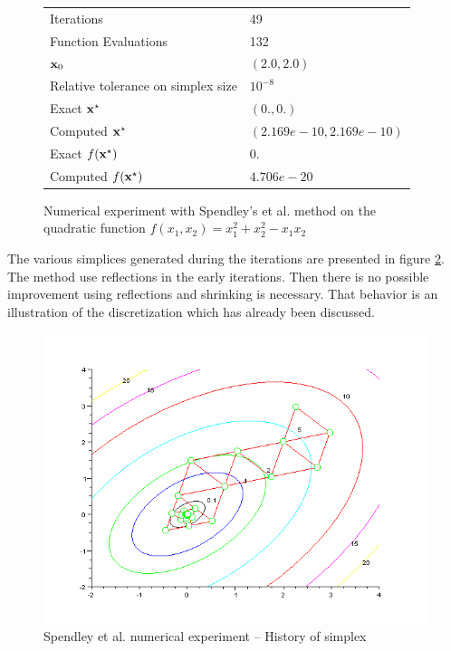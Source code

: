 \begin{figure}[htbp]
\begin{center}
\begin{tabular}{|l|l|}
\hline
Iterations & 49 \\
Function Evaluations & 132 \\
$\mathbf{x}_0$ & $(2.0,2.0)$ \\
Relative tolerance on simplex size & $10^{-8}$ \\
Exact $\mathbf{x}^\star$ & $(0.,0.)$\\
Computed $\mathbf{x}^\star$ & $(2.169e-10, 2.169e-10)$\\
Exact $f(\mathbf{x}^\star)$ & $0.$\\
Computed $f(\mathbf{x}^\star)$ & $4.706e-20$\\
\hline
\end{tabular}
\end{center}
\caption{Numerical experiment with Spendley's et al. method on the quadratic function
$f(x_1,x_2) = x_1^2 + x_2^2 - x_1 x_2$}
\label{fig-spendley-numexp1-table}
\end{figure}

The various simplices generated during the iterations are 
presented in figure \ref{fig-spendley-numexp1-historysimplex}.
The method use reflections in the early iterations. Then there
is no possible improvement using reflections and shrinking is necessary.
That behavior is an illustration of the discretization which has already
been discussed.

\begin{figure}
\begin{center}
\includegraphics[width=15cm]{spendleymethod/quad2bis-spendley-simplexcontours.png}
\end{center}
\caption{Spendley et al. numerical experiment -- History of simplex}
\label{fig-spendley-numexp1-historysimplex}
\end{figure}


